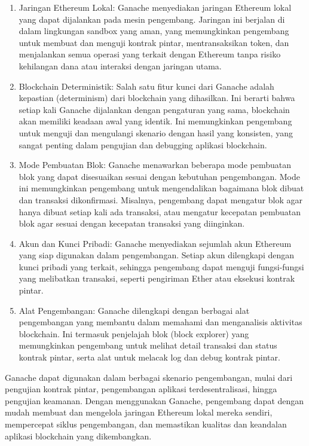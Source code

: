 \begin{enumerate}
  \item Jaringan Ethereum Lokal: Ganache menyediakan jaringan Ethereum lokal yang dapat dijalankan pada mesin pengembang. Jaringan ini berjalan di dalam lingkungan sandbox yang aman, yang memungkinkan pengembang untuk membuat dan menguji kontrak pintar, mentransaksikan token, dan menjalankan semua operasi yang terkait dengan Ethereum tanpa risiko kehilangan dana atau interaksi dengan jaringan utama.
  \item Blockchain Deterministik: Salah satu fitur kunci dari Ganache adalah kepastian (determinism) dari blockchain yang dihasilkan. Ini berarti bahwa setiap kali Ganache dijalankan dengan pengaturan yang sama, blockchain akan memiliki keadaan awal yang identik. Ini memungkinkan pengembang untuk menguji dan mengulangi skenario dengan hasil yang konsisten, yang sangat penting dalam pengujian dan debugging aplikasi blockchain.
  \item Mode Pembuatan Blok: Ganache menawarkan beberapa mode pembuatan blok yang dapat disesuaikan sesuai dengan kebutuhan pengembangan. Mode ini memungkinkan pengembang untuk mengendalikan bagaimana blok dibuat dan transaksi dikonfirmasi. Misalnya, pengembang dapat mengatur blok agar hanya dibuat setiap kali ada transaksi, atau mengatur kecepatan pembuatan blok agar sesuai dengan kecepatan transaksi yang diinginkan.
  \item Akun dan Kunci Pribadi: Ganache menyediakan sejumlah akun Ethereum yang siap digunakan dalam pengembangan. Setiap akun dilengkapi dengan kunci pribadi yang terkait, sehingga pengembang dapat menguji fungsi-fungsi yang melibatkan transaksi, seperti pengiriman Ether atau eksekusi kontrak pintar.
  \item Alat Pengembangan: Ganache dilengkapi dengan berbagai alat pengembangan yang membantu dalam memahami dan menganalisis aktivitas blockchain. Ini termasuk penjelajah blok (block explorer) yang memungkinkan pengembang untuk melihat detail transaksi dan status kontrak pintar, serta alat untuk melacak log dan debug kontrak pintar.
\end{enumerate}

Ganache dapat digunakan dalam berbagai skenario pengembangan, mulai dari pengujian kontrak pintar, pengembangan aplikasi terdesentralisasi, hingga pengujian keamanan. Dengan menggunakan Ganache, pengembang dapat dengan mudah membuat dan mengelola jaringan Ethereum lokal mereka sendiri, mempercepat siklus pengembangan, dan memastikan kualitas dan keandalan aplikasi blockchain yang dikembangkan.

